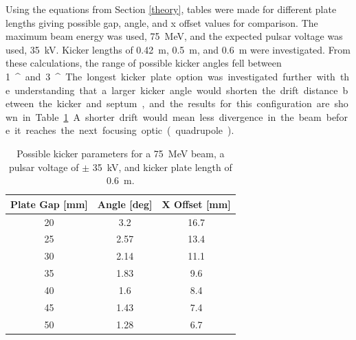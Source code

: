 Using the equations from Section \ref{theory}, 
tables were made for different plate lengths giving possible gap, angle, and x offset values for comparison. 
The maximum beam energy was used, \SI{75}{MeV}, and the expected pulsar voltage was used, \SI{35}{kV}.
Kicker lengths of \SI{0.42}{m}, \SI{0.5}{m}, and \SI{0.6}{m} were investigated.
From these calculations, the range of possible kicker angles fell between \SI{1}{^\circ} and \SI{3}{^\circ}.
The longest kicker plate option was investigated further with the understanding that 
a larger kicker angle would shorten the drift distance between the kicker and septum, 
and the results for this configuration are shown in Table \ref{tab:kickparam}.
A shorter drift would mean less divergence in the beam before it reaches the next focusing optic (quadrupole).
\begin{table}%
	\begin{center}
		\caption{Possible kicker parameters for a \SI{75}{MeV} beam,  
		a pulsar voltage of $\pm$ \SI{35}{kV}, 
		and kicker plate length of \SI{0.6}{m}.}\label{tab:kickparam}
	\begin{tabular}{ccc}
		\toprule
		\toprule
		\textbf{Plate Gap [mm]} & \textbf{Angle [deg]}  & \textbf{X Offset [mm]} \\ \hline
		20 & 3.2   & 16.7    \\ %
		25 & 2.57  & 13.4  \\ %
		30 & 2.14  & 11.1 \\		 
		35 & 1.83  & 9.6	  \\
		40 & 1.6   & 8.4		 \\
		45 & 1.43  & 7.4      \\
		50 & 1.28  & 6.7   \\ \hline
	\end{tabular}	
	\end{center}
\end{table}

